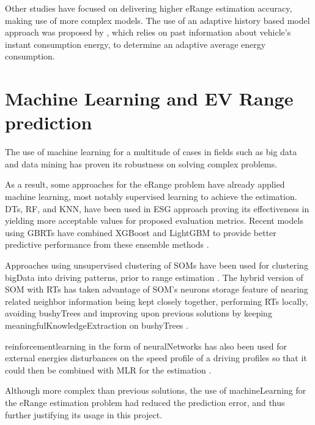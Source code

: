 Other studies have focused on delivering 
higher \gls{eRange} estimation accuracy,
making use of more complex models. 
The use of an adaptive history based model 
approach was proposed by \citep{classicEVX},
which relies on past information about
vehicle's instant consumption energy, to determine an
adaptive average energy consumption.

\section{Machine Learning and EV Range prediction}
\label{sec:stateOfArtML}

The use of machine learning for a multitude
of cases \citep{machineLearningCaseStudy} in fields such as 
big data \citep{machineLearningBigData, machineLearningBigData2}
and data mining \citep{businessDataMining} has 
proven its robustness on solving complex problems.


As a result, some approaches for the \gls{eRange}
problem have already applied machine learning,
most notably supervised learning to achieve the estimation.
\Glspl{DT}, \gls{RF}, and \gls{KNN}, have been 
used in \gls{ESG} approach 
\citep{eRangeMachineLearningEnsemble} proving its 
effectiveness in yielding more acceptable values
for proposed evaluation metrics.
Recent models using \glspl{GBRT} have
combined \gls{XGBoost} and \gls{LightGBM} 
to provide better predictive performance
from these \gls{ensemble} methods 
\citep{machineLearningERangeGradientBoostRts}.

Approaches using unsupervised clustering 
of \glspl{SOM} have been used for clustering \gls{bigData} 
into driving patterns, prior to range estimation 
\citep{eRangeMachineLearningGHSOM}.
The hybrid version of \gls{SOM} with \glspl{RT} 
has taken advantage of \gls{SOM}'s neurons storage 
feature of nearing related neighbor information
being kept closely together, performing \glspl{RT}
locally, avoiding \glspl{bushyTree} and improving
upon previous solutions by keeping 
\gls{meaningfulKnowledgeExtraction} on \glspl{bushyTree}
\citep{machineLearningERangeSOMandRts}.

\Gls{reinforcementlearning} in the form of \glspl{neuralNetwork}
has also been used for external energies 
disturbances on the speed profile of a driving profiles 
so that it could then be combined with \gls{MLR} 
for the estimation \citep{eRangeMachineLearningNeuralnetworkMLR}.

Although more complex than previous solutions, 
the use of \gls{machineLearning} for the 
\gls{eRange} estimation problem had reduced 
the prediction error, and thus further justifying
its usage in this project.  


